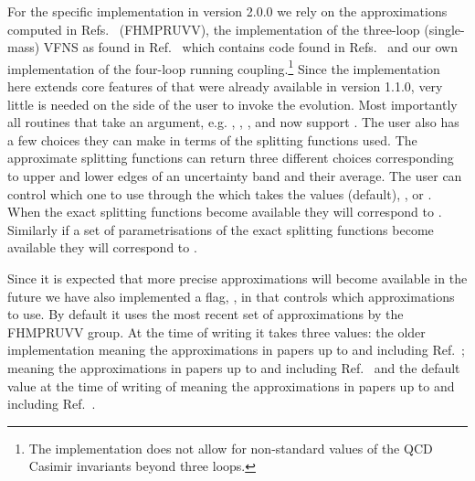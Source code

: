 For the specific implementation in \hoppet version 2.0.0 we rely on
the approximations computed in
Refs.~\cite{Davies:2016jie,Moch:2017uml,Falcioni:2023luc,Falcioni:2023vqq,Moch:2023tdj,Falcioni:2024xyt,Falcioni:2024qpd} (FHMPRUVV),
the implementation of the three-loop (single-mass) VFNS as found in
Ref.~\cite{BlumleinCode} which contains code found in
Refs.~\cite{Ablinger:2024xtt,Fael:2022miw} and our own implementation
of the four-loop running coupling.\footnote{The implementation does
not allow for non-standard values of the QCD Casimir invariants beyond
three loops.}
%
Since the implementation here extends core features of \hoppet that
were already available in version 1.1.0, very little is needed on the
side of the user to invoke the evolution.
%
Most importantly all routines that take an  argument,
e.g. , ,
, and  now support .
%
The user also has a few choices they can make in terms of the
splitting functions used.
%
The approximate splitting functions can return
three different
choices corresponding to upper and lower edges of an uncertainty band and their
average. 
%
The user can control which one to use through the
 which takes the values
 (default),
, or .
%
When the exact splitting functions become available they will
correspond to .
%
Similarly if a set of parametrisations of the exact splitting
functions become available they will correspond to
.

Since it is expected that more precise approximations will become
available in the future we have also implemented a flag,
, in
 that controls which approximations
to use. By default it uses the most recent set of approximations by
the FHMPRUVV group. At the time of writing it takes three values: the
older implementation
 meaning the
approximations in papers up to and including Ref.~\cite{Moch:2023tdj};
 meaning the
approximations in papers up to and including
Ref.~\cite{Falcioni:2024xyt} and the default value at the time of
writing of 
meaning the approximations in papers up to and including
Ref.~\cite{Falcioni:2024qpd}.

